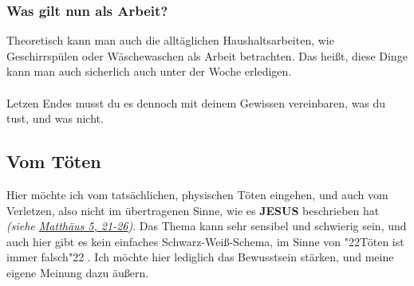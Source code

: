 \documentclass[12pt,a5paper]{article}
\newcommand{\Jesus}[0]{\textbf{JESUS}}
\newcommand{\q}[1]{\char"22{#1}\char"22 }
\begin{document}
	\subsubsection{Was gilt nun als Arbeit?}
		Theoretisch kann man auch die allt\"aglichen Haushaltsarbeiten,
		wie Geschirrsp\"ulen oder W\"aschewaschen als Arbeit betrachten.
		Das hei{\ss}t,
		diese Dinge kann man auch sicherlich auch unter der Woche erledigen.
		\\
		\\
		Letzen Endes musst du es dennoch mit deinem Gewissen vereinbaren,
		was du tust,
		und was nicht.

	\newpage
	\subsection{Vom T\"oten} \label{VomToeten}
		Hier m\"ochte ich vom tats\"achlichen,
		physischen T\"oten eingehen,
		und auch vom Verletzen,
		also nicht im \"ubertragenen Sinne,
		wie es {\Jesus} beschrieben hat
		\textit{(siehe \href{https://www.die-bibel.de/bibeln/online-bibeln/lesen/LU17/MAT.5/Matthäus-5}{Matth\"aus 5, 21-26})}.
		Das Thema kann sehr sensibel und schwierig sein,
		und auch hier gibt es kein einfaches Schwarz-Wei{\ss}-Schema,
		im Sinne von \q{T\"oten ist immer falsch}.
		Ich m\"ochte hier lediglich das Bewusstsein st\"arken,
		und meine eigene Meinung dazu \"au{\ss}ern.
	
\end{document}
